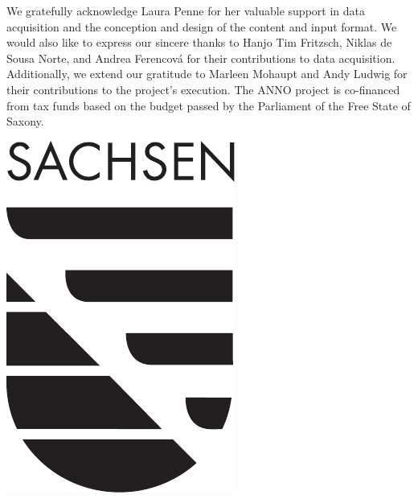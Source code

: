 \documentclass[sw]{iosart2x}
\begin{document}
\begin{ack}
\noindent\begin{minipage}{0.90\textwidth}
We gratefully acknowledge Laura Penne for her valuable support in data acquisition and the conception and design of the content and input format.
We would also like to express our sincere thanks to Hanjo Tim Fritzsch, Niklas de Sousa Norte, and Andrea Ferencová for their contributions to data acquisition.
Additionally, we extend our gratitude to Marleen Mohaupt and Andy Ludwig for their contributions to the project's execution.
The ANNO project is co-financed from tax funds based on the budget passed by the Parliament of the Free State of Saxony.

\end{minipage}%
\hfill%
\begin{minipage}{0.04\textwidth}\raggedleft
\includegraphics[width=\textwidth]{img/saxony.pdf}
\end{minipage}
\end{ack}



\end{document}
